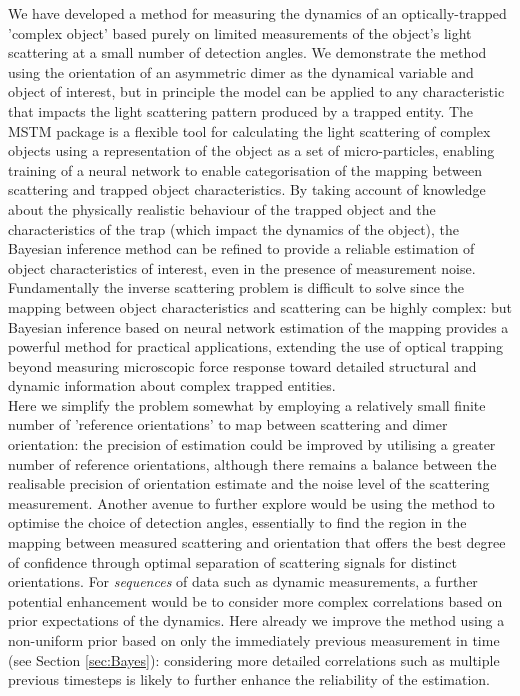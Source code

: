 \documentclass[final,  3p]{elsarticle}
\begin{document}
We have developed a method for measuring the dynamics of an optically-trapped 'complex object' based purely on limited measurements of the object's light scattering at a small number of detection angles. We demonstrate the method using the orientation of an asymmetric dimer as the dynamical variable and object of interest, but in principle the model can be applied to any characteristic that impacts the light scattering pattern produced by a trapped entity. The MSTM package is a flexible tool for calculating the light scattering of complex objects using a representation of the object as a set of micro-particles, enabling training of a neural network to enable categorisation of the mapping between scattering and trapped object characteristics. By taking account of knowledge about the physically realistic behaviour of the trapped object and the characteristics of the trap (which impact the dynamics of the object), the Bayesian inference method can be refined to provide a reliable estimation of object characteristics of interest, even in the presence of measurement noise. Fundamentally the inverse scattering problem is difficult to solve since the mapping between object characteristics and scattering can be highly complex: but Bayesian inference based on neural network estimation of the mapping provides a powerful method for practical applications, extending the use of optical trapping beyond measuring microscopic force response toward detailed structural and dynamic information about complex trapped entities.\\

Here we simplify the problem somewhat by employing a relatively small finite number of 'reference orientations' to map between scattering and dimer orientation: the precision of estimation could be improved by utilising a greater number of reference orientations, although there remains a balance between the realisable precision of orientation estimate and the noise level of the scattering measurement. Another avenue to further explore would be using the method to optimise the choice of detection angles, essentially to find the region in the mapping between measured scattering and orientation that offers the best degree of confidence through optimal separation of scattering signals for distinct orientations. For \textit{sequences} of data such as dynamic measurements, a further potential enhancement would be to consider more complex correlations based on prior expectations of the dynamics. Here already we improve the method using a non-uniform prior based on only the immediately previous measurement in time (see Section \ref{sec:Bayes}): considering more detailed correlations such as multiple previous timesteps is likely to further enhance the reliability of the estimation.
\end{document}
